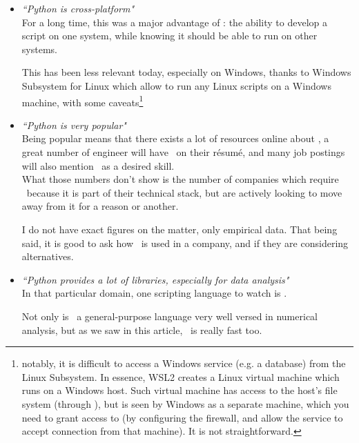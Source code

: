 \begin{itemize}
	\item \emph{``Python is cross-platform"} \\
	
	For a long time, this was a major advantage of \python: the ability to develop a script on one system, while knowing it should be able to run on other systems.  \\
	
	
	
	\newpage
	
	This has been less relevant today, especially on Windows, thanks to Windows Subsystem for Linux which allow to run any Linux scripts on a Windows machine, with some caveats\footnote{notably, it is difficult to access a Windows service (e.g. a database) from the Linux Subsystem. In essence, WSL2 creates a Linux virtual machine which runs on a Windows host. Such virtual machine has access to the host's file system (through ), but is seen by Windows as a separate machine, which you need to grant access to (by configuring the firewall, and allow the service to accept connection from that machine). It is not straightforward.} \\
	
	\bigskip
	
	\item \emph{``Python is very popular"} \\
	
	Being popular means that there exists a lot of resources online about \python, a great number of engineer will have \python\ on their résumé, and many job postings will also mention \python\ as a desired skill. \\
	
	What those numbers don't show is the number of companies which require \python\ because it is part of their technical stack, but are actively looking to move away from it for a reason or another.
	
	I do not have exact figures on the matter, only empirical data. That being said, it is good to ask how \python\ is used in a company, and if they are considering alternatives. \\
	
	\bigskip

	\item \emph{``Python provides a lot of libraries, especially for data analysis"}	\\
	
	In that particular domain, one scripting language to watch is \julia.
	
	Not only is \julia\ a general-purpose language very well versed in numerical analysis, but as we saw in this article, \julia\ is really fast too. \\
		
\end{itemize}


